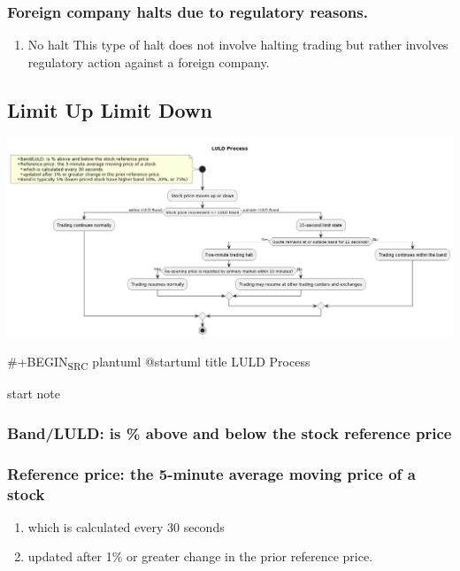 \documentclass[11pt]{article}
\begin{document}
\subsubsection{Foreign company halts due to regulatory reasons.}
\label{sec:orgdcfc545}
\begin{enumerate}
\item No halt
\label{sec:org306e667}
This type of halt does not involve halting trading but rather involves regulatory action against a foreign company.
\end{enumerate}
\subsection{Limit Up Limit Down}
\label{sec:orgd5c0b5e}
\begin{center}
\includegraphics[width=.9\linewidth]{./LULD_FLOW.png}
\end{center}
\#+BEGIN\textsubscript{SRC} plantuml
@startuml
title LULD Process

start
note
\subsubsection{Band/LULD: is \% above and below the stock reference price}
\label{sec:orga87f1cd}
\subsubsection{Reference price: the 5-minute average moving price of a stock}
\label{sec:org286f087}
\begin{enumerate}
\item which is calculated every 30 seconds
\label{sec:org15c7bd0}
\item updated after 1\% or greater change in the prior reference price.
\label{sec:org6cf5df2}
\end{enumerate}
\end{document}
